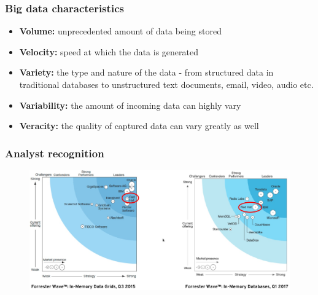 \documentclass[10pt,utf8]{beamer}
\begin{document}
\begin{frame}
	\frametitle{Big data characteristics}
	\begin{itemize}
		\item \textbf{Volume:} unprecedented amount of data being stored
		\item \textbf{Velocity:} speed at which the data is generated
		\item \textbf{Variety:} the type and nature of the data - from structured data in traditional databases to unstructured text documents, email, video, audio etc.
		\item \textbf{Variability:} the amount of incoming data can highly vary
		\item \textbf{Veracity:} the quality of captured data can vary greatly as well
	\end{itemize}
\end{frame}

\begin{frame}
	\frametitle{Analyst recognition}
	\begin{figure}
		\centering
		\includegraphics[width=12cm]{./img/analyst_recognition.eps}
	\end{figure}
\end{frame}
\end{document}
